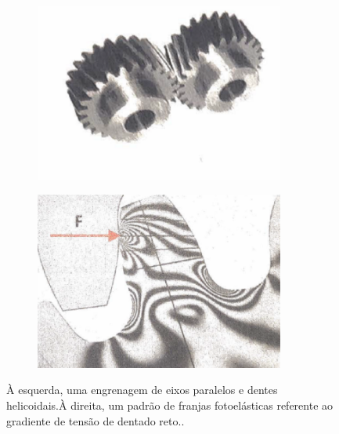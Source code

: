 \begin{figure}[htb]
    \centering
    \begin{subfigure}{.5\textwidth}
        \centering
        \includegraphics[width = 0.9\textwidth]{Figures/Cap2/Completo_rodas.png}
        \caption{}
        \label{fig:dentes elicoidais}
    \end{subfigure}%
    \begin{subfigure}{.5\textwidth}
        \centering
        \includegraphics[width = 0.9\textwidth]{Figures/Cap2/Completo2019.png}
        \caption{}
        \label{fig:franjas_fotoelásticas}
    \end{subfigure}
\caption[Engrenagem de eixos paralelos e um padrão de franjas fotoelásticas]%
{À esquerda, uma engrenagem de eixos paralelos e dentes helicoidais.À direita, um padrão de franjas fotoelásticas referente ao gradiente de tensão de dentado reto.\cite{Completo2019}.}
\end{figure}

